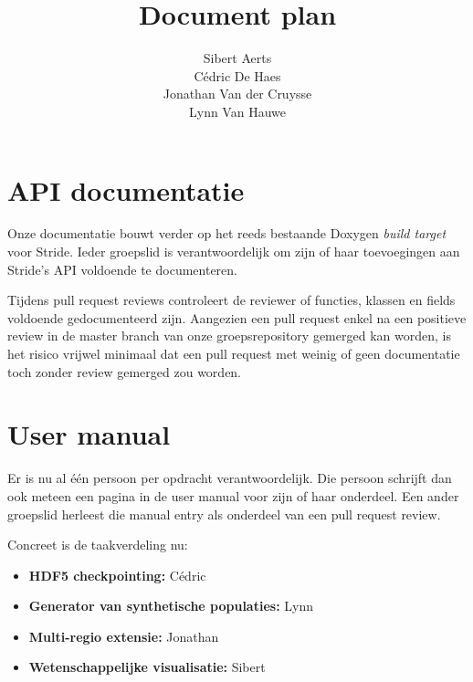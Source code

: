 \documentclass[12pt,a4paper]{article}
\author{Sibert Aerts \\ Cédric De Haes \\ Jonathan Van der Cruysse \\ Lynn Van Hauwe}
\title{Document plan}
\begin{document}
	
	\newcommand{\titleitem}[1]{\item \textbf{#1}}

	\maketitle
	
	\section{API documentatie}
	
	Onze documentatie bouwt verder op het reeds bestaande Doxygen \emph{build target} voor Stride. Ieder groepslid is verantwoordelijk om zijn of haar toevoegingen aan Stride's API voldoende te documenteren.
	
	Tijdens pull request reviews controleert de reviewer of functies, klassen en fields voldoende gedocumenteerd zijn. Aangezien een pull request enkel na een positieve review in de master branch van onze groepsrepository gemerged kan worden, is het risico vrijwel minimaal dat een pull request met weinig of geen documentatie toch zonder review gemerged zou worden.
	
	\section{User manual}
	
	Er is nu al \'e\'en persoon per opdracht verantwoordelijk. Die persoon schrijft dan ook meteen een pagina in de user manual voor zijn of haar onderdeel. Een ander groepslid herleest die manual entry als onderdeel van een pull request review.
	
	Concreet is de taakverdeling nu:
	
	\begin{itemize}
		\titleitem{HDF5 checkpointing:} Cédric
		\titleitem{Generator van synthetische populaties:} Lynn
		\titleitem{Multi-regio extensie:} Jonathan
		\titleitem{Wetenschappelijke visualisatie:} Sibert
	\end{itemize}
\end{document}

